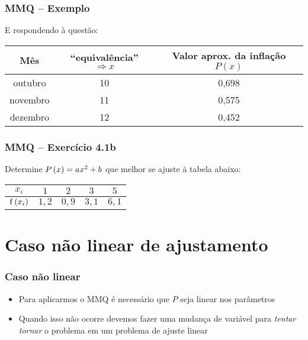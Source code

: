 \begin{frame}
\frametitle{MMQ -- Exemplo}
E respondendo à questão:

\begin{tabular}{c|c|c}
\hline
Mês & ``equivalência'' $\Rightarrow x$ & Valor aprox. da inflação $P\left(x\right)$\\
\hline
outubro & 10 & 0,698 \\
\hline
novembro & 11 & 0,575 \\
\hline
dezembro & 12 & 0,452 \\
\hline
\end{tabular}
\end{frame}

\begin{frame}
\frametitle{MMQ -- Exercício 4.1b}

Determine $P \left(x\right) = a x^2 + b$ que melhor se ajuste à tabela abaixo:

\begin{center}
\begin{tabular}{|c|c|c|c|c|}
\hline
$x_i$ & $1$ & $2$ & $3$ & $5$\\
\hline
$\mathrm{f}\left(x_i\right)$ & $1,2$ & $0,9$ & $3,1$ & $6,1$\\
\hline 
\end{tabular}
\end{center}

\end{frame}

\section{Caso não linear de ajustamento}

\begin{frame}
\frametitle{Caso não linear}

\begin{itemize}
  \item Para aplicarmos o MMQ é necessário que $P$ seja linear nos parâmetros
  \item Quando isso não ocorre devemos fazer uma mudança de variável para \emph{tentar tornar} o problema em um problema de ajuste linear 
\end{itemize}

\end{frame}

